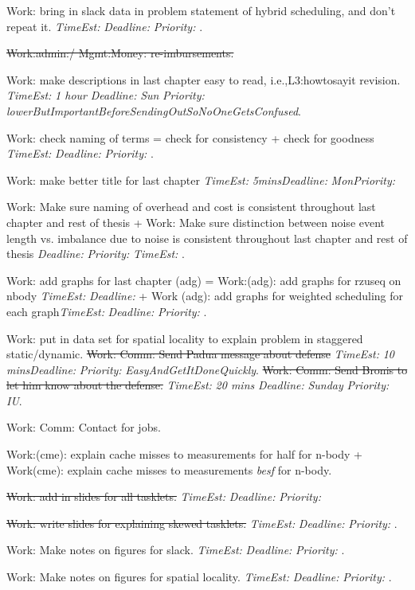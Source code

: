 \documentclass[12pt] {article}
\newcommand{\doneTask}[1]{\sout{#1}}
\newcommand{\dl}[1]{\textit{Deadline:} \textit{#1}}
\newcommand{\te}[1]{\textit{TimeEst:} \textit{#1}}
\newcommand{\pr}[1]{\textit{Priority:} \textit{#1}}
\begin{document}
\begin{enumerate}
{\item Work: bring in slack data in problem statement of hybrid 
scheduling, and don't repeat it. \te{} \dl{} \pr{}. 

\doneTask{Work:admin:/ Mgmt:Money: re-imbursements.}

\item Work: make descriptions in last chapter easy to read, 
i.e.,L3:howtosayit revision. \te{1 hour} \dl{Sun} 
\pr{lowerButImportantBeforeSendingOutSoNoOneGetsConfused}.

\item Work: check naming of terms = check for consistency + check for goodness 
  \te{} \dl{} \pr{}.

\item Work: make better title for last chapter \te{5mins}\dl{Mon}\pr{}

\item Work: Make sure naming of overhead and cost is consistent 
throughout last chapter and rest of thesis + Work: Make sure
distinction between noise event length vs. imbalance due to noise 
is consistent throughout last chapter and rest of thesis \dl{} \pr{}
\te{}.
\item Work: add graphs for last chapter (adg) = 
  Work:(adg): add graphs for rzuseq on nbody \te{} \dl{} + 
  Work (adg): add graphs for weighted scheduling for each 
  graph\te{} \dl{} \pr{}.
\item Work: put in data set for spatial locality to explain problem in
  staggered static/dynamic. 
\doneTask{Work: Comm: Send Padua message about defense} \te{10 mins}\dl{}\pr{EasyAndGetItDoneQuickly}.
\doneTask {Work: Comm: Send Bronis to let him know about the defense.} \te{20 mins} \dl{Sunday} \pr{IU}. 
\item Work: Comm: Contact for jobs. 

\item Work:(cme): explain cache misses to measurements for half for 
  n-body + Work(cme): explain cache misses to measurements \textit{besf} for n-body. 

\doneTask{ Work: add in slides for all tasklets.} \te{} \dl{} \pr{} 

\doneTask{Work: write slides for explaining skewed tasklets.} \te{} \dl{} \pr{}. 

\item Work: Make notes on figures for slack. \te{} \dl{} \pr{}. 

\item Work: Make notes on figures for spatial locality. \te{} \dl{} \pr{}. 

}
\end{enumerate}
\end{document}
